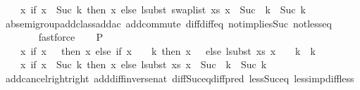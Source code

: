 \begin{isabellebody}
\ \ \ \ {\isacharparenleft}{\kern0pt}{\isasymlambda}x{\isachardot}{\kern0pt}\ if\ x\ {\isacharless}{\kern0pt}\ Suc\ k\ then\ x\ else\ lsubst\ {\isacharparenleft}{\kern0pt}swap{\isacharunderscore}{\kern0pt}list\ xs{\isacharparenright}{\kern0pt}\ {\isacharparenleft}{\kern0pt}x\ {\isacharminus}{\kern0pt}\ {\isacharparenleft}{\kern0pt}Suc\ \ k{\isacharparenright}{\kern0pt}{\isacharparenright}{\kern0pt}\ {\isacharplus}{\kern0pt}\ {\isacharparenleft}{\kern0pt}Suc\ k{\isacharparenright}{\kern0pt}{\isacharparenright}{\kern0pt}{\isachardoublequoteclose}\isanewline
\ \ \ \ \isamarkupfalse%
\ ab{\isacharunderscore}{\kern0pt}semigroup{\isacharunderscore}{\kern0pt}add{\isacharunderscore}{\kern0pt}class{\isachardot}{\kern0pt}add{\isacharunderscore}{\kern0pt}ac{\isacharparenleft}{\kern0pt}{}{\isacharparenright}{\kern0pt}\ add{\isachardot}{\kern0pt}commute\ diff{\isacharunderscore}{\kern0pt}diff{\isacharunderscore}{\kern0pt}eq\ not{}{\isacharunderscore}{\kern0pt}implies{\isacharunderscore}{\kern0pt}Suc\ not{\isacharunderscore}{\kern0pt}less{\isacharunderscore}{\kern0pt}eq\isanewline
\ \ \ \ \ \ \isamarkupfalse%
\ fastforce\isanewline
\isanewline
\ \ \isamarkupfalse%
\ P{}{\isacharcolon}{\kern0pt}\isanewline
\ \ \ \ {\isachardoublequoteopen}{\isacharparenleft}{\kern0pt}{\isasymlambda}x{\isachardot}{\kern0pt}\ if\ x\ {\isacharequal}{\kern0pt}\ {}\ then\ x\ else\ {\isacharparenleft}{\kern0pt}if\ x\ {\isacharminus}{\kern0pt}\ {}\ {\isacharless}{\kern0pt}\ k\ then\ x\ {\isacharminus}{\kern0pt}\ {}\ else\ lsubst\ xs\ {\isacharparenleft}{\kern0pt}x\ {\isacharminus}{\kern0pt}\ {}\ {\isacharminus}{\kern0pt}\ k{\isacharparenright}{\kern0pt}\ {\isacharplus}{\kern0pt}\ k{\isacharparenright}{\kern0pt}\ {\isacharplus}{\kern0pt}\ {}{\isacharparenright}{\kern0pt}\ {\isacharequal}{\kern0pt}\isanewline
\ \ \ \ {\isacharparenleft}{\kern0pt}{\isasymlambda}x{\isachardot}{\kern0pt}\ if\ x\ {\isacharless}{\kern0pt}\ Suc\ k\ then\ x\ else\ lsubst\ xs\ {\isacharparenleft}{\kern0pt}x\ {\isacharminus}{\kern0pt}\ {\isacharparenleft}{\kern0pt}Suc\ \ k{\isacharparenright}{\kern0pt}{\isacharparenright}{\kern0pt}\ {\isacharplus}{\kern0pt}\ {\isacharparenleft}{\kern0pt}Suc\ k{\isacharparenright}{\kern0pt}{\isacharparenright}{\kern0pt}{\isachardoublequoteclose}\isanewline
\ \ \ \ \isamarkupfalse%
\ add{\isacharunderscore}{\kern0pt}cancel{\isacharunderscore}{\kern0pt}right{\isacharunderscore}{\kern0pt}right\ add{\isacharunderscore}{\kern0pt}diff{\isacharunderscore}{\kern0pt}inverse{\isacharunderscore}{\kern0pt}nat\ diff{\isacharunderscore}{\kern0pt}Suc{\isacharunderscore}{\kern0pt}eq{\isacharunderscore}{\kern0pt}diff{\isacharunderscore}{\kern0pt}pred\ less{\isacharunderscore}{\kern0pt}Suc{\isacharunderscore}{\kern0pt}eq\ less{\isacharunderscore}{\kern0pt}imp{\isacharunderscore}{\kern0pt}diff{\isacharunderscore}{\kern0pt}less\isanewline

\end{isabellebody}
